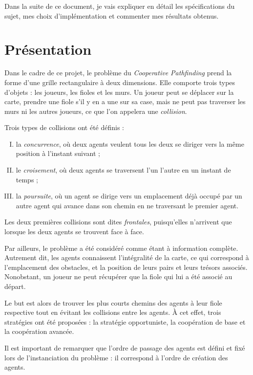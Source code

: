\documentclass[letterpaper]{article}
\begin{document}
Dans la suite de ce document, je vais expliquer en d\'etail les sp\'ecifications du sujet, mes choix d'impl\'ementation et commenter mes r\'esultats obtenus.

\section{Pr\'esentation}
Dans le cadre de ce projet, le probl\`eme du \textit{Cooperative Pathfinding} prend la forme d'une grille rectangulaire \`a deux dimensions.
Elle comporte trois types d'objets : les joueurs, les fioles et les murs.
Un joueur peut se d\'eplacer sur la carte, prendre une fiole s'il y en a une sur sa case, mais ne peut pas traverser les murs ni les autres joueurs, ce que l'on appelera une \textit{collision}.

Trois types de collisions ont \'et\'e d\'efinis :
\begin{enumerate}[(I)]
 \item la \textit{concurrence}, o\`u deux agents veulent tous les deux se diriger vers la m\^eme position \`a l'instant suivant ;
 \item le \textit{croisement}, o\`u deux agents se traversent l'un l'autre en un instant de temps ;
 \item la \textit{poursuite}, o\`u un agent se dirige vers un emplacement d\'ej\`a occup\'e par un autre agent qui avance dans son chemin en ne traversant le premier agent. 
\end{enumerate}
Les deux premi\`eres collisions sont dites \textit{frontales}, puisqu'elles n'arrivent que lorsque les deux agents se trouvent face \`a face.

Par ailleurs, le probl\`eme a \'et\'e consid\'er\'e comme \'etant \`a information compl\`ete. 
Autrement dit, les agents connaissent l'int\'egralit\'e de la carte, ce qui correspond \`a l'emplacement des obstacles, et la position de leurs pairs et leurs tr\'esors associ\'es.
Nonobstant, un joueur ne peut r\'ecup\'erer que la fiole qui lui a \'et\'e associ\'e au d\'epart.

Le but est alors de trouver les plus courts chemins des agents \`a leur fiole respective tout en \'evitant les collisions entre les agents.
\`A cet effet, trois strat\'egies ont \'et\'e propos\'ees : la strat\'egie opportuniste, la coop\'eration de base et la coop\'eration avanc\'ee.

Il est important de remarquer que l'ordre de passage des agents est d\'efini et fix\'e lors de l'instanciation du probl\`eme : il correspond \`a l'ordre de cr\'eation des agents.
\end{document}
